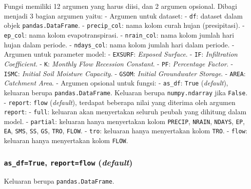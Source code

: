\documentclass[11pt]{article}
\begin{document}
Fungsi memiliki 12 argumen yang harus diisi, dan 2 argumen opsional.
Dibagi menjadi 3 bagian argumen yaitu: - Argumen untuk dataset: -
\texttt{df}: dataset dalam objek \texttt{pandas.DataFrame}. -
\texttt{precip\_col}: nama kolom curah hujan (presipitasi). -
\texttt{ep\_col}: nama kolom evapotranspirasi. - \texttt{nrain\_col}:
nama kolom jumlah hari hujan dalam periode. - \texttt{ndays\_col}: nama
kolom jumlah hari dalam periode. - Argumen untuk parameter model: -
\texttt{EXSURF}: \emph{Exposed Surface}. - \texttt{IF}:
\emph{Infiltration Coefficient}. - \texttt{K}: \emph{Monthly Flow
Recession Constant}. - \texttt{PF}: \emph{Percentage Factor}. -
\texttt{ISMC}: \emph{Initial Soil Moisture Capacity}. - \texttt{GSOM}:
\emph{Initial Groundwater Storage}. - \texttt{AREA}: \emph{Catchment
Area}. - Argumen opsional untuk fungsi: - \texttt{as\_df}: \texttt{True}
(\emph{default}), keluaran berupa \texttt{pandas.DataFrame}. Keluaran
berupa \texttt{numpy.ndarray} jika \texttt{False}. - \texttt{report}:
\texttt{\textquotesingle{}flow\textquotesingle{}} (\emph{default}),
terdapat beberapa nilai yang diterima oleh argumen \texttt{report}: -
\texttt{full}: keluaran akan menyertakan seluruh peubah yang dihitung
dalam model. - \texttt{partial}: keluaran hanya menyertakan kolom
\texttt{PRECIP}, \texttt{NRAIN}, \texttt{NDAYS}, \texttt{EP},
\texttt{EA}, \texttt{SMS}, \texttt{SS}, \texttt{GS}, \texttt{TRO},
\texttt{FLOW}. - \texttt{tro}: keluaran hanya menyertakan kolom
\texttt{TRO}. - \texttt{flow}: keluaran hanya menyertakan kolom
\texttt{FLOW}.

    \hypertarget{as_dftrue-reportflow-default}{%
\subsubsection{\texorpdfstring{\texttt{as\_df=True},
\texttt{report=\textquotesingle{}flow\textquotesingle{}}
(\emph{default})}{as\_df=True, report='flow' (default)}}\label{as_dftrue-reportflow-default}}

Keluaran berupa \texttt{pandas.DataFrame}.
\end{document}
